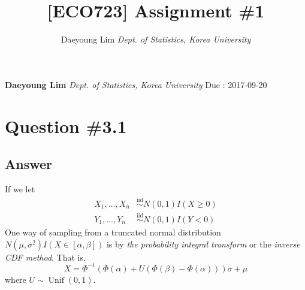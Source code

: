 \documentclass[11pt,]{article}
\title{{[}ECO723{]} Assignment \#1  }
\author{\Large Daeyoung Lim\vspace{0.05in} \newline\normalsize\emph{Dept. of Statistics, Korea University}  }
\newcommand*{\authorfont}{\fontfamily{phv}\selectfont}
\begin{document}
	


{%
\setlength{\parindent}{0pt}
\thispagestyle{plain}
{\fontsize{18}{20}\selectfont\raggedright 
\maketitle  %

}

{
   \vskip 25pt\relax \normalsize\fontsize{11}{12} 
\textbf{\authorfont Daeyoung Lim} \hskip 15pt \emph{\small Dept. of Statistics, Korea University}   
\vskip 11pt\relax \normalsize Due : 2017-09-20
}

}





\vskip 6.5pt

\noindent  \section{Question \#3.1}\label{question-3.1}

\subsection{Answer}\label{answer}

If we let \[
\begin{aligned}
X_{1},\ldots, X_{n} &\overset{\text{iid}}{\sim} N\left(0,1\right)I(X \geq 0)\\
Y_{1},\ldots, Y_{n} &\overset{\text{iid}}{\sim} N\left(0,1\right)I(Y < 0)
\end{aligned}
\] One way of sampling from a truncated normal distribution
\(N(\mu, \sigma^{2})I(X \in [\alpha, \beta])\) is by \emph{the
probability integral transform} or the \emph{inverse CDF method}. That
is, \[
X = \Phi^{-1}(\Phi(\alpha)+U(\Phi(\beta)-\Phi(\alpha)))\sigma + \mu
\] where \(U\sim \operatorname{Unif}(0,1)\).
\end{document}
